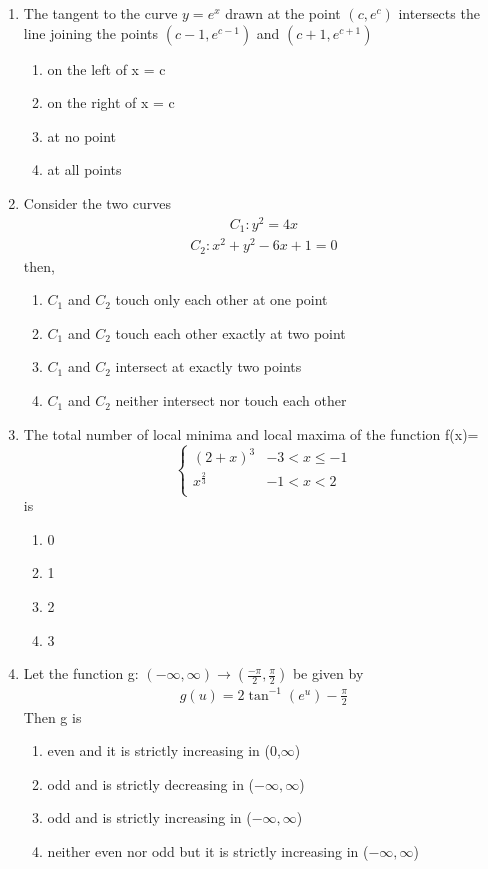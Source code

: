 \begin{enumerate}[label=\arabic*.,ref=\thesubsection.\theenumi]
\item The tangent to the curve $y = e^x$ drawn at the point $(c, e^c)$ intersects the line joining the points 
$(c - 1, e^{c - 1})$ and $(c + 1, e^{c + 1})$ 
\begin{enumerate}
\item on the left of x = c
\item on the right of x = c
\item at no point 
\item at all points
\end{enumerate}

\item Consider the two curves
\begin{align*}
C_1: y^2 = 4x
\end{align*}
\begin{align*}
C_2: x^2 + y^2 - 6x + 1 = 0 
\end{align*}
then,
\begin{enumerate}
\item $C_1$ and $C_2$ touch only each other at one point
\item $C_1$ and $C_2$ touch each other exactly at two point
\item $C_1$ and $C_2$ intersect at exactly two points
\item $C_1$ and $C_2$ neither intersect nor touch each other
\end{enumerate}

\item The total number of local minima and local maxima of the function 
f(x)=
\[ \begin{cases} 
      (2 + x)^3 &  -3 < x \leq -1 \\
      x^{\frac{2}{3}}& -1 < x < 2\\
   \end{cases}
\]
is 
\begin{enumerate}
\item 0
\item 1
\item 2
\item 3
\end{enumerate}

\item Let the function g: $(-\infty, \infty) \to (\frac{-\pi}{2}, \frac{\pi}{2})$ be given by 
\begin{align*}
g(u) = 2\tan^{-1}(e^u) - \frac{\pi}{2}
\end{align*}
 Then g is
\begin{enumerate}
\item even and it is strictly increasing in (0,$\infty$)
\item odd and is strictly decreasing in ($-\infty,\infty$)
\item odd and is strictly increasing in ($-\infty,\infty$)
\item neither even nor odd but it is strictly increasing in ($-\infty,\infty$)  
\end{enumerate}


\end{enumerate}
